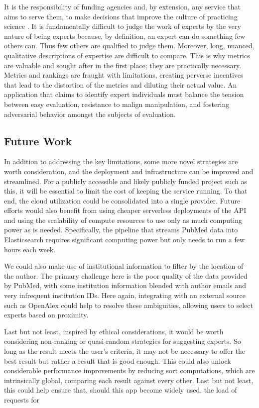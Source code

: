 It is the responsibility of funding agencies and, by extension, any service that aims to serve them, to make decisions that improve the culture of practicing science \cite{ref-metrics-games-academics-play}. It is fundamentally difficult to judge the work of experts by the very nature of being experts because, by definition, an expert can do something few others can. Thus few others are qualified to judge them. Moreover, long, nuanced, qualitative descriptions of expertise are difficult to compare. This is why metrics are valuable and sought after in the first place; they are practically necessary. Metrics and rankings are fraught with limitations, creating perverse incentives that lead to the distortion of the metrics and diluting their actual value. An application that claims to identify expert individuals must balance the tension between easy evaluation, resistance to malign manipulation, and fostering adversarial behavior amongst the subjects of evaluation.

\subsection{Future Work}

In addition to addressing the key limitations, some more novel strategies are worth consideration, and the deployment and infrastructure can be improved and streamlined. For a publicly accessible and likely publicly funded project such as this, it will be essential to limit the cost of keeping the service running. To that end, the cloud utilization could be consolidated into a single provider. Future efforts would also benefit from using cheaper serverless deployments of the API and using the scalability of compute resources to use only as much computing power as is needed. Specifically, the pipeline that streams PubMed data into Elasticsearch requires significant computing power but only needs to run a few hours each week.

We could also make use of institutional information to filter by the location of the author. The primary challenge here is the poor quality of the data provided by PubMed, with some institution information blended with author emails and very infrequent institution IDs. Here again, integrating with an external source such as OpenAlex could help to resolve these ambiguities, allowing users to select experts based on proximity.

Last but not least, inspired by ethical considerations, it would be worth considering non-ranking or quasi-random strategies for suggesting experts. So long as the result meets the user's criteria, it may not be necessary to offer the best result but rather a result that is good enough. This could also unlock considerable performance improvements by reducing sort computations, which are intrinsically global, comparing each result against every other. Last but not least, this could help ensure that, should this app become widely used, the load of requests for 